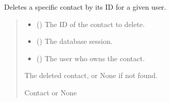 \documentclass[letterpaper,10pt,english]{sphinxmanual}
\begin{document}
\begin{fulllineitems}
\label{\detokenize{index:src.repository.contacts.delete_contact}}
\pysigstartsignatures
{}
\pysigstopsignatures
\sphinxAtStartPar
Deletes a specific contact by its ID for a given user.
\begin{quote}\begin{description}
\begin{itemize}
\item {} 
\sphinxAtStartPar
{} () \textendash{} The ID of the contact to delete.

\item {} 
\sphinxAtStartPar
{} () \textendash{} The database session.

\item {} 
\sphinxAtStartPar
{} () \textendash{} The user who owns the contact.

\end{itemize}

\sphinxAtStartPar
The deleted contact, or None if not found.

\sphinxAtStartPar
Contact or None

\end{description}\end{quote}

\end{fulllineitems}

\end{document}
